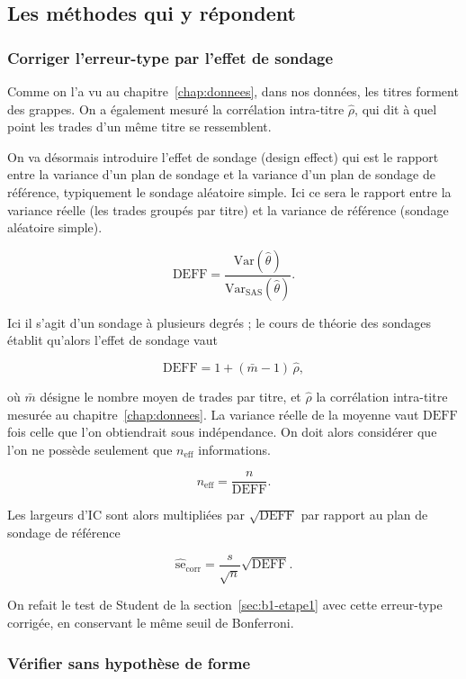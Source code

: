 \subsection{Les méthodes qui y répondent}

\subsubsection*{Corriger l'erreur-type par l'effet de sondage}

Comme on l'a vu au chapitre~\ref{chap:donnees}, dans nos données, les titres
forment des grappes. On a également mesuré la corrélation intra-titre
$\hat\rho$, qui dit à quel point les trades d'un même titre se ressemblent.

On va désormais introduire l'effet de sondage (design effect) qui est le rapport
entre la variance d'un plan de sondage et la variance d'un plan de sondage de
référence, typiquement le sondage aléatoire simple.
Ici ce sera le rapport entre la variance réelle (les trades groupés par titre)
et la variance de référence (sondage aléatoire simple).

\[
  \mathrm{DEFF}
    = \frac{\mathrm{Var}(\hat\theta)}{\mathrm{Var}_{\mathrm{SAS}}(\hat\theta)} .
\]

Ici il s'agit d'un sondage à plusieurs degrés ; le cours de théorie des
sondages établit qu'alors l'effet de sondage vaut

\[
  \mathrm{DEFF} = 1 + (\bar m - 1)\,\hat\rho ,
\]

où $\bar m$ désigne le nombre moyen de trades par titre, et $\hat\rho$ la
corrélation intra-titre mesurée au chapitre~\ref{chap:donnees}.
La variance réelle de la moyenne vaut $\mathrm{DEFF}$ fois celle que l'on
obtiendrait sous indépendance. On doit alors considérer que l'on ne possède
seulement que $n_{\mathrm{eff}}$ informations.

\[
  n_{\mathrm{eff}} = \frac{n}{\mathrm{DEFF}} .
\]

Les largeurs d'IC sont alors multipliées par $\sqrt{\mathrm{DEFF}}$ par rapport au
plan de sondage de référence

\[
  \widehat{\mathrm{se}}_{\mathrm{corr}}
        = \frac{s}{\sqrt{n}}\sqrt{\mathrm{DEFF}} .
\]

On refait le test de Student de la section~\ref{sec:b1-etape1} avec cette
erreur-type corrigée, en
conservant le même seuil de Bonferroni.

\subsubsection*{Vérifier sans hypothèse de forme}

